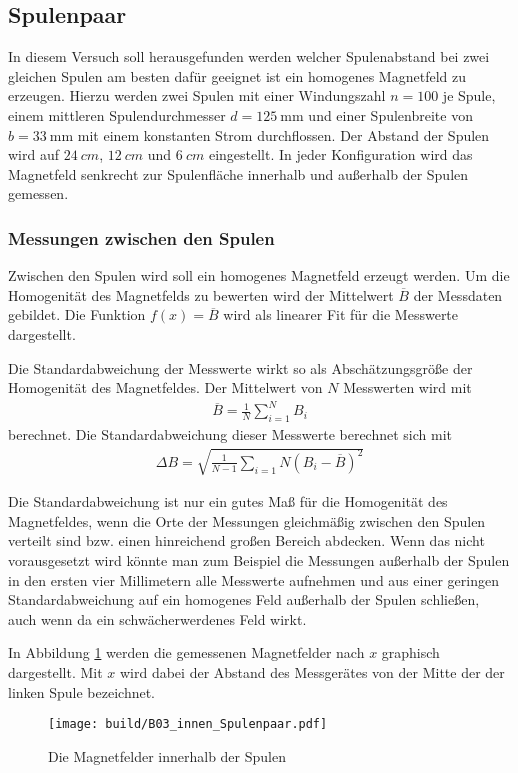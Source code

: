 \subsection{Spulenpaar}
In diesem Versuch soll herausgefunden werden welcher Spulenabstand bei zwei gleichen Spulen
am besten dafür geeignet ist ein homogenes Magnetfeld zu erzeugen.
Hierzu werden zwei Spulen mit einer Windungszahl $n= 100$ je Spule, einem mittleren Spulendurchmesser $d = \qty{125}{\mm}$
und einer Spulenbreite von $b = \qty[]{33}{\mm}$ mit einem konstanten Strom durchflossen.
Der Abstand der Spulen wird auf $\qty[]{24}{cm}$, $\qty[]{12}{cm}$ und $\qty[]{6}{cm}$ eingestellt.
In jeder Konfiguration wird das Magnetfeld senkrecht zur Spulenfläche innerhalb und außerhalb der Spulen gemessen.

\subsubsection{Messungen zwischen den Spulen}
Zwischen den Spulen wird soll ein homogenes Magnetfeld erzeugt werden.
Um die Homogenität des Magnetfelds zu bewerten wird der Mittelwert $\overline{B}$ der Messdaten gebildet.
Die Funktion $f(x) = \overline{B}$  wird als linearer Fit für die Messwerte dargestellt.





Die Standardabweichung der Messwerte wirkt so als Abschätzungsgröße der Homogenität des Magnetfeldes.
Der Mittelwert von $N$ Messwerten wird mit
\begin{align}
    \overline{B} = \frac{1}{N} \sum_{i=1}^{N} B_{i}
\end{align} 
berechnet.
Die Standardabweichung dieser Messwerte berechnet sich mit
\begin{align}
    \Delta B = \sqrt{\frac{1}{N-1} \sum_{i=1}{N}\left(B_{i}- \overline{B}\right)^2}
\end{align}

Die Standardabweichung ist nur ein gutes Maß für die Homogenität des Magnetfeldes, 
wenn die Orte der Messungen gleichmäßig zwischen den Spulen verteilt sind bzw. einen hinreichend großen Bereich abdecken.
Wenn das nicht vorausgesetzt wird könnte man zum Beispiel die Messungen außerhalb der Spulen in den ersten vier Millimetern
alle Messwerte aufnehmen und aus einer geringen Standardabweichung auf ein homogenes Feld außerhalb der Spulen schließen,
auch wenn da ein schwächerwerdenes Feld wirkt.


In Abbildung \ref{fig:B03_innen} werden die gemessenen Magnetfelder nach $x$ graphisch dargestellt.
Mit $x$ wird dabei der Abstand des Messgerätes von der Mitte der der linken Spule bezeichnet.
\begin{figure}
    \centering
    \caption{Die Magnetfelder innerhalb der Spulen}
    \label{fig:B03_innen}
    \texttt{[image: build/B03\_innen\_Spulenpaar.pdf]}
\end{figure}
